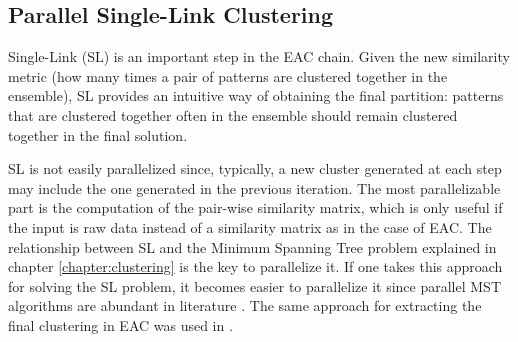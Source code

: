 \subsection{Parallel Single-Link Clustering}

Single-Link (SL) is an important step in the EAC chain.
Given the new similarity metric (how many times a pair of patterns are clustered together in the ensemble), SL provides an intuitive way of obtaining the final partition: patterns that are clustered together often in the ensemble should remain clustered together in the final solution.


SL is not easily parallelized since, typically, a new cluster generated at each step may include the one generated in the previous iteration.
The most parallelizable part is the computation of the pair-wise similarity matrix, which is only useful if the input is raw data instead of a similarity matrix as in the case of EAC.
The relationship between SL and the Minimum Spanning Tree problem explained in chapter \ref{chapter:clustering} is the key to parallelize it.
If one takes this approach for solving the SL problem, it becomes easier to parallelize it since parallel MST algorithms are abundant in literature \cite{Vineet2009,rostrup2013fast,Sousa2015}.
The same approach for extracting the final clustering in EAC was used in \cite{Fred2002}.




